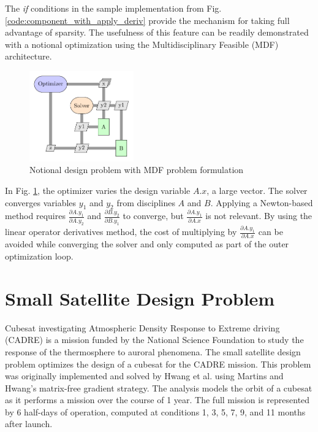\documentclass[]{aiaa-tc} %
\begin{document}
    The \textit{if} conditions in the sample implementation from Fig. \ref{code:component_with_apply_deriv} provide the
    mechanism for taking full advantage of sparsity. The usefulness of this feature can be readily demonstrated with
    a notional optimization using the Multidisciplinary Feasible (MDF) architecture\cite{martins:arch:survey}.

    \begin{figure}[htbp]
        \centering
        \includegraphics[width=0.4\textwidth]{xdsm/mdf_sample}
        \caption{Notional design problem with MDF problem formulation}
        \label{fig:MDF:XDSM}
    \end{figure}

    In Fig. \ref{fig:MDF:XDSM}, the optimizer varies the design variable $A.x$, a large vector.
    The solver converges variables $y_1$ and $y_2$ from disciplines $A$ and $B$. Applying a
    Newton-based method requires $\frac{\partial A.y_1}{\partial A.y_2}$ and $\frac{\partial B.y_2}{\partial B.y_1}$
    to converge, but $\frac{\partial A.y_1}{\partial A.x}$ is not relevant. By using the linear operator derivatives method,
    the cost of multiplying by $\frac{\partial A.y_1}{\partial A.x}$ can be avoided while converging the solver and only
    computed as part of the outer optimization loop.

    \section{Small Satellite Design Problem}

    Cubesat investigating Atmospheric Density Response to Extreme driving (CADRE)
    is a mission funded by the National Science Foundation to study the
    response of the thermosphere to auroral phenomena\cite{cutler2011cubesat}.
    The small satellite design problem optimizes the design of a cubesat for the CADRE mission.
    This problem was originally implemented and solved by Hwang et al.\cite{CADRE2012} using
    Martins and Hwang's matrix-free gradient strategy. The analysis models the orbit of a cubesat
    as it performs a mission over the course of 1 year. The full mission is represented
    by 6 half-days of operation, computed at conditions 1, 3, 5, 7, 9, and 11 months after launch.
\end{document}
